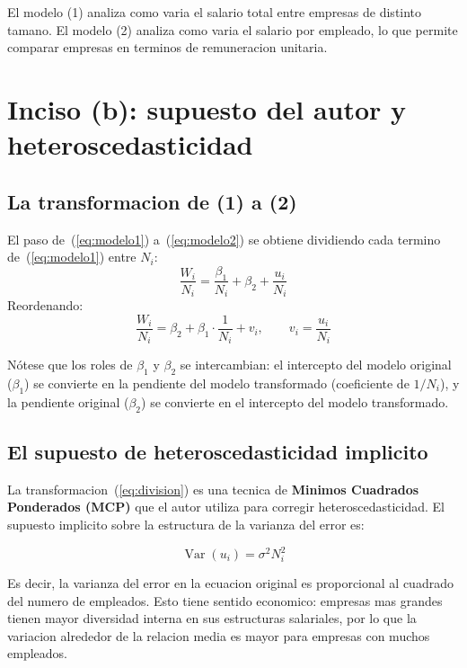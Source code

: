 \documentclass[12pt, letterpaper]{article}
\theoremstyle{remark}
\newcommand{\Var}{\operatorname{Var}}
\begin{document}
\begin{clave}
  El modelo (1) analiza como varia el salario total entre empresas de distinto
  tamano. El modelo (2) analiza como varia el salario por empleado, lo que
  permite comparar empresas en terminos de remuneracion unitaria.
\end{clave}

\section{Inciso (b): supuesto del autor y heteroscedasticidad}

\subsection{La transformacion de (1) a (2)}

El paso de~(\ref{eq:modelo1}) a~(\ref{eq:modelo2}) se obtiene dividiendo cada
termino de~(\ref{eq:modelo1}) entre $N_i$:
\begin{equation}
  \frac{W_i}{N_i} = \frac{\beta_1}{N_i} + \beta_2 + \frac{u_i}{N_i}
  \label{eq:division}
\end{equation}
Reordenando:
\begin{equation}
  \frac{W_i}{N_i} = \beta_2 + \beta_1 \cdot \frac{1}{N_i} + v_i,
  \qquad v_i = \frac{u_i}{N_i}
  \label{eq:transformado}
\end{equation}

Nótese que los roles de $\beta_1$ y $\beta_2$ se intercambian: el intercepto del
modelo original ($\beta_1$) se convierte en la pendiente del modelo transformado
(coeficiente de $1/N_i$), y la pendiente original ($\beta_2$) se convierte en el
intercepto del modelo transformado.

\subsection{El supuesto de heteroscedasticidad implicito}

La transformacion~(\ref{eq:division}) es una tecnica de \textbf{Minimos Cuadrados
Ponderados (MCP)} que el autor utiliza para corregir heteroscedasticidad. El
supuesto implicito sobre la estructura de la varianza del error es:

\begin{equation}
  \Var(u_i) = \sigma^2 N_i^2
  \label{eq:supuesto_heterosc}
\end{equation}

Es decir, la varianza del error en la ecuacion original es proporcional al
cuadrado del numero de empleados. Esto tiene sentido economico: empresas mas
grandes tienen mayor diversidad interna en sus estructuras salariales, por lo que
la variacion alrededor de la relacion media es mayor para empresas con muchos
empleados.
\end{document}
